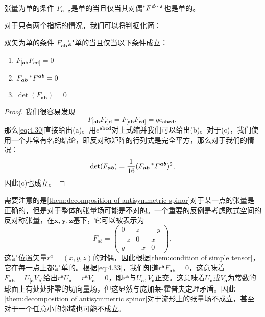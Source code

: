 \begin{them}[label={them:condition of simple tensor}]{张量为单的条件}
	$F_{\boldsymbol{a} \cdots \boldsymbol{g}}$是单的当且仅当其对偶$\prescript{*}{}{} F^{\boldsymbol{d} \cdots \boldsymbol{s}}$也是单的。
\end{them}

对于只有两个指标的情况，我们可以将判据化简：

\begin{them}[label={them:condition of simple bivector}]{双矢为单的条件}
	$F_{\boldsymbol{ab}}$是单的当且仅当以下条件成立：
	\begin{enumerate}[label=(\alph*)]
		\item $F_{[\boldsymbol{ab}} F_{\boldsymbol{cd}]} =0$
		\item $F_{\boldsymbol{ab}}\prescript{*}{}{} F^{\boldsymbol{ab}} =0$
		\item $\det( F_{\boldsymbol{ab}}) =0$
	\end{enumerate}
\end{them}

\begin{proof}
	我们很容易发现
	\begin{equation*}
		F_{[\boldsymbol{ab}} F_{\boldsymbol{c}]\boldsymbol{d}} =F_{[\boldsymbol{ab}} F_{\boldsymbol{cd}]} =qe\boldsymbol{_{abcd}} ,
	\end{equation*}
	那么\ref{eq:4.30}直接给出(a)。用$e^{\boldsymbol{abcd}}$对上式缩并我们可以给出(b)。对于(c)，我们使用一个非常有名的结论，即反对称矩阵的行列式是完全平方，那么对于我们的情况：
	\begin{equation*}
		\det( F_{\boldsymbol{ab}}) =\frac{1}{16} (F_{\boldsymbol{ab}}\prescript{*}{}{} F^{\boldsymbol{ab}} )^{2} ,
	\end{equation*}
	因此(c)也成立。
\end{proof}

需要注意的是\ref{them:decomposition of antisymmetric spinor}对于某一点的张量是正确的，但是对于整体的张量场可能是不对的。一个重要的反例是考虑欧式空间的反对称张量，在$\boldsymbol{x} ,\boldsymbol{y} ,\boldsymbol{z}$基下，它可以被表示为
\begin{equation*}
	F_{ab} =\begin{pmatrix}
		0 & z & -y\\
		-z & 0 & x\\
		y & -x & 0
	\end{pmatrix} ,
\end{equation*}
这是位置矢量$r^{a} =( x,y,z)$的对偶，因此根据\ref{them:condition of simple tensor}，它在每一点上都是单的。根据\ref{eq:4.33}，我们知道$r^{\boldsymbol{a}} F_{\boldsymbol{ab}} =0$，这意味着$F_{\boldsymbol{ab}} =U_{[\boldsymbol{a}} V_{\boldsymbol{b}]}$给出$r^{\boldsymbol{a}} U_{\boldsymbol{a}} =r^{\boldsymbol{a}} V_{\boldsymbol{a}} =0$，即$r^{\boldsymbol{a}}$与$U_{\boldsymbol{a}} ,V_{\boldsymbol{a}}$正交。这意味着$U_{\boldsymbol{a}}$或$V_{\boldsymbol{a}}$为常数的球面上有处处非零的切向量场，但这显然与庞加莱-霍普夫定理矛盾。因此\ref{them:decomposition of antisymmetric spinor}对于流形上的张量场不成立，甚至对于一个任意小的邻域也可能不成立。


